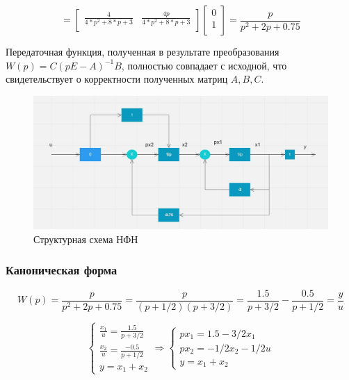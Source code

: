 \documentclass[14pt,a4paper,report]{report}
\begin{document}
\begin{equation*}
\text{$=\begin{bmatrix}
\frac{4}{4*p^2 + 8*p + 3} & \frac{4p}{4*p^2 + 8*p + 3} \\
\end{bmatrix}\begin{bmatrix}
0 \\
1 \\
\end{bmatrix}=\frac{p}{p^2+2p+0.75}
$}
\end{equation*}

Передаточная функция, полученная в результате преобразования $W(p)=C(pE-A)^{-1}B$, полностью совпадает с исходной, что свидетельствует о корректности полученных матриц  $A, B, C$. 

\clearpage

\begin{figure}[h!]
	\centering
	\includegraphics[scale = 0.5]{images/nfn.jpg}
	\caption{Структурная схема НФН}
	\label{image:2}
\end{figure}

\subsubsection{Каноническая форма}

\begin{equation*}
\text{$W(p)=\frac{p}{p^2+2p+0.75}=\frac{p}{(p+1/2)(p+3/2)}=\frac{1.5}{p+3/2}-\frac{0.5}{p+1/2}=\frac{y}{u}$}
\end{equation*}

\begin{equation*}
\begin{cases}
	\text{$\frac{x_1}{u}=\frac{1.5}{p+3/2}$} \\
	\text{$\frac{x_2}{u}=\frac{-0.5}{p+1/2}$} \\
	\text{$y=x_1+x_2$}
\end{cases}
\Longrightarrow
\begin{cases}
\text{$px_1=1.5-3/2x_1$} \\
\text{$px_2=-1/2x_2-1/2u$} \\
\text{$y=x_1+x_2$}
\end{cases}
\end{equation*}
\end{document}
